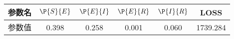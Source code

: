 \begin{tabular}{cccccc}
\hline
参数名&$\P{S}{E}$&$\P{E}{I}$&$\P{E}{R}$&$\P{I}{R}$&LOSS\\
\hline
参数值&0.398&0.258&0.001&0.060&1739.284\\
\hline
\end{tabular}
